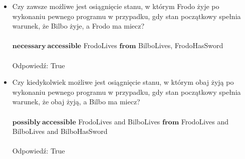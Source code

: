 \documentclass[11pt,a4paper]{article}
\begin{document}
\begin{itemize}
\item Czy zawsze możliwe jest osiągnięcie stanu, w którym Frodo żyje po wykonaniu pewnego programu w przypadku, gdy stan początkowy spełnia warunek, że Bilbo żyje, a Frodo ma miecz? \\ \\
$\mathbf{necessary~accessible}$ FrodoLives $\mathbf{from}$ BilboLives, FrodoHasSword \\ \\
Odpowiedź: True

\item Czy kiedykolwiek możliwe jest osiągnięcie stanu, w którym obaj żyją po wykonaniu pewnego programu w przypadku, gdy stan początkowy spełnia warunek, że obaj żyją, a Bilbo ma miecz? \\ \\
$\mathbf{possibly~accessible}$ FrodoLives and BilboLives $\mathbf{from}$ FrodoLives and BilboLives and BilboHasSword \\ \\
Odpowiedź: True

\end{itemize}
\end{document}

